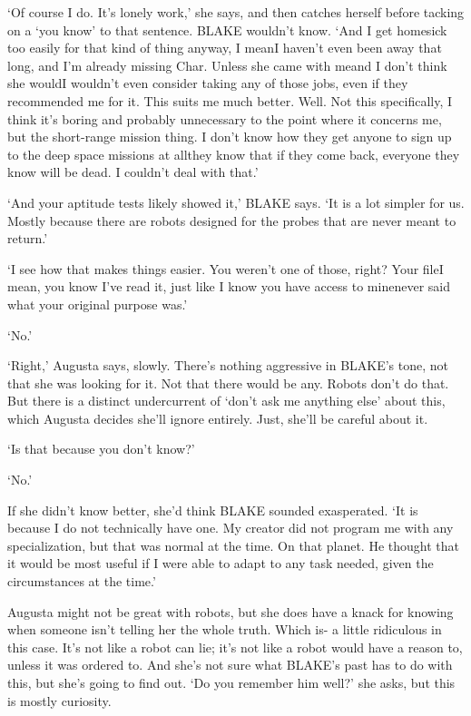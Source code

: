 `Of course I do. It's lonely work,' she says, and then catches herself
before tacking on a `you know' to that sentence. BLAKE wouldn't
know. `And I get homesick too easily for that kind of thing anyway, I
mean\textemdash I haven't even been away that long, and I'm already
missing Char. Unless she came with me\textemdash and I don't think
she would\textemdash I wouldn't even consider taking any of those
jobs, even if they recommended me for it. This suits me much
better. Well. Not this specifically, I think it's boring and probably
unnecessary to the point where it concerns me, but the short-range
mission thing. I don't know how they get anyone to sign up to the deep
space missions at all\textellipsis they know that if they come back,
everyone they know will be dead. I couldn't deal with that.'


`And your aptitude tests likely showed it,' BLAKE says. `It is a lot
simpler for us. Mostly because there are robots designed for the
probes that are never meant to return.'

`I see how that makes things easier. You weren't one of those, right?
Your file\textemdash I mean, you know I've read it, just like I
know you have access to mine\textemdash never said what your
original purpose was.'

`No.'

`Right,' Augusta says, slowly. There's nothing aggressive in BLAKE's
tone, not that she was looking for it. Not that there would be
any. Robots don't do that. But there is a distinct undercurrent of
`don't ask me anything else' about this, which Augusta decides she'll
ignore entirely. Just, she'll be careful about it.

`Is that because you don't know?'

`No.'

If she didn't know better, she'd think BLAKE sounded exasperated. `It
is because I do not technically have one. My creator did not program
me with any specialization, but that was normal at the time. On that
planet. He thought that it would be most useful if I were able to
adapt to any task needed, given the circumstances at the time.'

Augusta might not be great with robots, but she does have a knack for
knowing when someone isn't telling her the whole truth. Which is- a
little ridiculous in this case. It's not like a robot can lie; it's
not like a robot would have a reason to, unless it was ordered to. And
she's not sure what BLAKE's past has to do with this, but she's going
to find out.  `Do you remember him well?' she asks, but this is mostly
curiosity.

